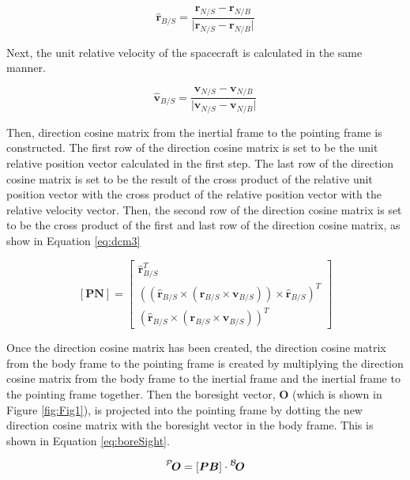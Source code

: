  \begin{equation}
 	\label{eq:rePos}
 	\hat{\bm r}_{B/S} = \frac{\bm r_{N/S} - \bm r_{N/B}}{\vert \bm r_{N/S} - \bm r_{N/B} \vert}
\end{equation}

Next, the unit relative velocity of the spacecraft is calculated in the same manner.

 \begin{equation}
 	\label{eq:reVel}
 	\hat{\bm v}_{B/S} = \frac{\bm v_{N/S} - \bm v_{N/B}}{\vert \bm v_{N/S} - \bm v_{N/B} \vert}
\end{equation}

Then, direction cosine matrix from the inertial frame to the pointing frame is constructed. The first row of the direction cosine matrix is set to be the unit relative position vector calculated in the first step. The last row of the direction cosine matrix is set to be the result of the cross product of the relative unit position vector with the cross product of the relative position vector with the relative velocity vector. Then, the second row of the direction cosine matrix is set to be the cross product of the first and last row of the direction cosine matrix, as show in Equation \ref{eq:dcm3}

 \begin{equation}
 	\label{eq:dcm3}
 	[\bm{PN}] =  \begin{bmatrix}
    \hat{ \bm r}_{B/S}^T \\
     ((\hat{\bm r}_{B/S}  \times  (\bm r_{B/S}  \times \bm v_{B/S})) \times \hat{ \bm r}_{B/S}) ^T\\
    (\hat{\bm r}_{B/S}  \times  (\bm r_{B/S}  \times \bm v_{B/S}))^T
    \end{bmatrix}
\end{equation}

 Once the direction cosine matrix has been created, the direction cosine matrix from the body frame to the pointing frame is created by multiplying the direction cosine matrix from the body frame to the inertial frame and the inertial frame to the pointing frame together. Then the boresight vector, $\bm O$ (which is shown in Figure \ref{fig:Fig1}), is projected into the pointing frame by dotting the new direction cosine matrix with the boresight vector in the body frame. This is shown in Equation \ref{eq:boreSight}.

 \begin{equation}
 	\label{eq:boreSight}
 	\leftexp{P}{\bm {O}} = [\bm{PB}] \cdot\leftexp{B}{\bm {O}}
\end{equation}

